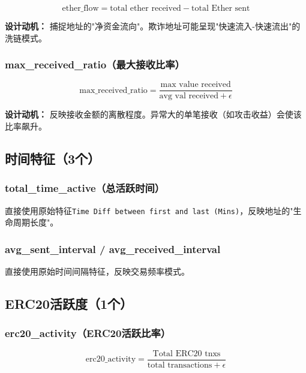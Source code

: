 \documentclass[12pt,a4paper]{article}
\begin{document}
\begin{equation}
\text{ether\_flow} = \text{total ether received} - \text{total Ether sent}
\end{equation}

\textbf{设计动机：} 捕捉地址的"净资金流向"。欺诈地址可能呈现"快速流入-快速流出"的洗链模式。

\subsubsection{max\_received\_ratio（最大接收比率）}

\begin{equation}
\text{max\_received\_ratio} = \frac{\text{max value received}}{\text{avg val received} + \epsilon}
\end{equation}

\textbf{设计动机：} 反映接收金额的离散程度。异常大的单笔接收（如攻击收益）会使该比率飙升。

\subsection{时间特征（3个）}

\subsubsection{total\_time\_active（总活跃时间）}

直接使用原始特征\texttt{Time Diff between first and last (Mins)}，反映地址的"生命周期长度"。

\subsubsection{avg\_sent\_interval / avg\_received\_interval}

直接使用原始时间间隔特征，反映交易频率模式。

\subsection{ERC20活跃度（1个）}

\subsubsection{erc20\_activity（ERC20活跃比率）}

\begin{equation}
\text{erc20\_activity} = \frac{\text{Total ERC20 tnxs}}{\text{total transactions} + \epsilon}
\end{equation}
\end{document}
